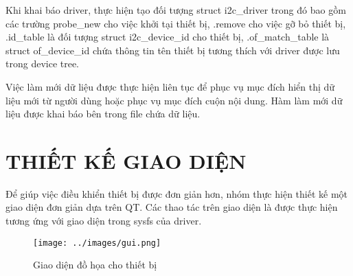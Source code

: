 \documentclass{report}
\begin{document}
Khi khai báo driver, thực hiện tạo đối tượng struct i2c\_driver trong đó bao gồm các trường probe\_new cho việc khởi tại thiết bị, .remove cho việc 	gỡ bỏ thiết bị, .id\_table là đối tượng struct i2c\_device\_id cho thiết bị, .of\_match\_table là struct of\_device\_id chứa thông tin tên thiết bị tương thích với driver được lưu trong device tree.


Việc làm mới dữ liệu được thực hiện liên tục để phục vụ mục đích hiển thị dữ liệu mới từ người dùng hoặc phục vụ mục đích cuộn nội dung. Hàm làm mới dữ liệu được khai báo bên trong file chứa dữ liệu.



\chapter{THIẾT KẾ GIAO DIỆN}
Để giúp việc điều khiển thiết bị được đơn giản hơn, nhóm thực hiện thiết kế một giao diện đơn giản dựa trên QT. Các thao tác trên giao diện là được thực hiện tương ứng với giao diện trong sysfs của driver.

\begin{figure}[H]
	\centering
	\texttt{[image: ../images/gui.png]}
	\caption{Giao diện đồ họa cho thiết bị}
\end{figure}
\end{document}

